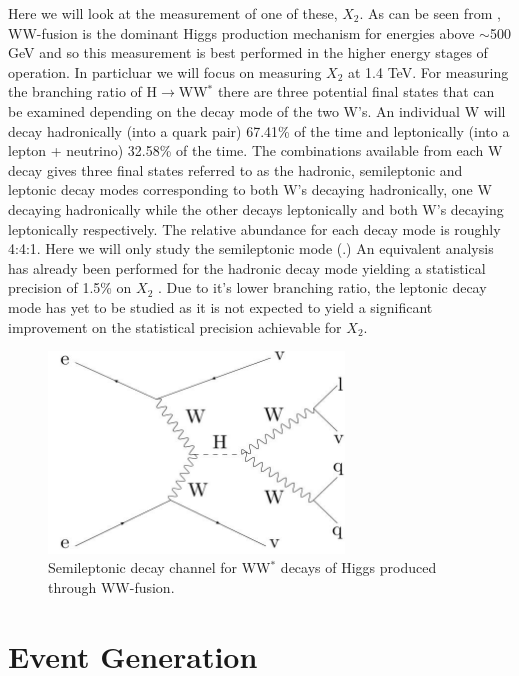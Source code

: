 Here we will look at the measurement of one of these, $X_2$. As can be seen from , WW-fusion is the dominant Higgs production mechanism for energies above $\sim $500 GeV and so this measurement is best performed in the higher energy stages of operation. In particluar we will focus on measuring $X_2$ at 1.4 TeV. For measuring the branching ratio of H$\rightarrow$WW$^*$ there are three potential final states that can be examined depending on the decay mode of the two W's. An individual W will decay hadronically (into a quark pair) 67.41\% of the time and leptonically (into a lepton + neutrino) 32.58\% of the time.  The combinations available from each W decay gives three final states referred to as the hadronic, semileptonic and leptonic decay modes corresponding to both W's decaying hadronically, one W decaying hadronically while the other decays leptonically and both W's decaying leptonically respectively. The relative abundance for each decay mode is roughly 4:4:1. Here we will only study the semileptonic mode (.) An equivalent analysis has already been performed for the hadronic decay mode yielding a statistical precision of 1.5\% on $X_2$ \cite{Abramowicz:2016zbo}. Due to it's lower branching ratio, the leptonic decay mode has yet to be studied as it is not expected to yield a significant improvement on the statistical precision achievable for $X_2$. 

\begin{figure}
  \centering
  \includegraphics[width=0.7\textwidth,keepaspectratio]{Experiments/fig/feynmann}
  \caption[Semileptonic decay channel for  WW$^*$ decays of Higgs produced through WW-fusion]{Semileptonic decay channel for  WW$^*$ decays of Higgs produced through WW-fusion.}
  \label{fig:semileptonic}
\end{figure}

\section{Event Generation}

